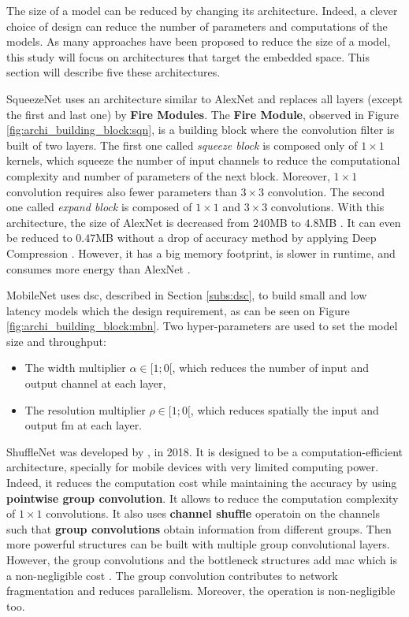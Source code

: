 %
The size of a model can be reduced by changing its architecture. Indeed, a clever choice of design can reduce the number of parameters and computations of the models. As many approaches have been proposed to reduce the size of a model, this study will focus on architectures that target the embedded space. This section will describe five these architectures.

SqueezeNet \cite{iandola_squeezenet_2016} uses an architecture similar to AlexNet and replaces all layers (except the first and last one) by \textbf{Fire Modules}. The \textbf{Fire Module}, observed in Figure \ref{fig:archi_building_block:sqn}, is a building block where the convolution filter is built of two layers. The first one called \textit{squeeze block} is composed only of $1 \times 1$ kernels, which squeeze the number of input channels to reduce the computational complexity and number of parameters of the next block. Moreover, $1 \times 1$ convolution requires also fewer parameters than $3 \times 3$ convolution.
The second one called \textit{expand block} is composed of $1 \times 1$ and $3 \times 3$ convolutions. With this architecture, the size of AlexNet is decreased from $240$MB to $4.8$MB \cite{iandola_squeezenet_2016}. It can even be reduced to $0.47$MB without a drop of accuracy method by applying Deep Compression \cite{han_deep_2016}. However, it has a big memory footprint, is slower in runtime, and consumes more energy than AlexNet \cite{sze_efficient_2017}.

MobileNet \cite{howard_mobilenets_2017} uses \acrshort{dsc}, described in Section \ref{subs:dsc}, to build small and low latency models which the design requirement, as can be seen on Figure \ref{fig:archi_building_block:mbn}. Two hyper-parameters are used to set the model size and throughput:
%
\begin{itemize}
    \item The width multiplier $\alpha \in [1; 0[$, which reduces the number of input and output channel at each layer,
    \item The resolution multiplier $\rho \in [1; 0[$,  which reduces spatially the input and output \acrshort{fm} at each layer.
\end{itemize}

ShuffleNet was developed by \textcite{zhang_shufflenet_2018}, in 2018. It is designed to be a computation-efficient architecture, specially for mobile devices with very limited computing power. Indeed, it reduces the computation cost while maintaining the accuracy by using \textbf{pointwise group convolution}. It allows to reduce the computation complexity of $1 \times 1$ convolutions. It also uses \textbf{channel shufﬂe} operatoin on the channels such that \textbf{group convolutions} obtain information from different groups. Then more powerful structures can be built with multiple group convolutional layers. However, the group convolutions and the bottleneck structures add \acrshort{mac} which is a non-negligible cost \cite{ma_shufflenet_2018}. The group convolution contributes to network fragmentation and reduces parallelism. Moreover, the  operation is non-negligible too.


